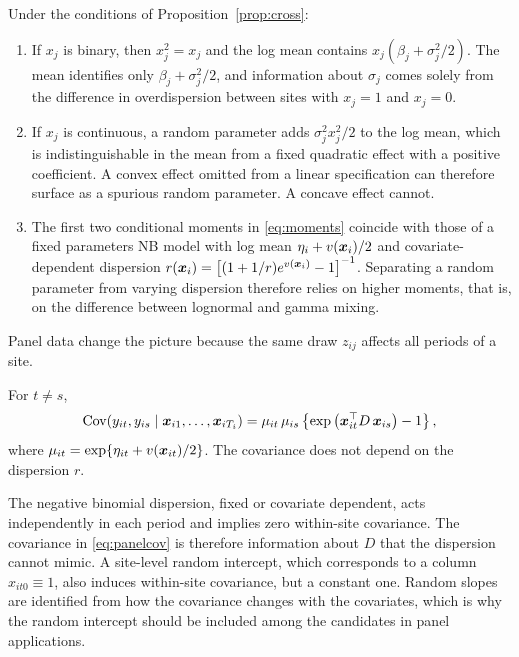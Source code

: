 \begin{corollary}\label{cor:confounding}
Under the conditions of Proposition~\ref{prop:cross}:
\begin{enumerate}[label=(\roman*)]
\item If $x_j$ is binary, then $x_j^2=x_j$ and the log mean contains $x_j(\beta_j+\sigma_j^2/2)$. The mean identifies only $\beta_j+\sigma_j^2/2$, and information about $\sigma_j$ comes solely from the difference in overdispersion between sites with $x_j=1$ and $x_j=0$.
\item If $x_j$ is continuous, a random parameter adds $\sigma_j^2x_j^2/2$ to the log mean, which is indistinguishable in the mean from a fixed quadratic effect with a positive coefficient. A convex effect omitted from a linear specification can therefore surface as a spurious random parameter. A concave effect cannot.
\item The first two conditional moments in \eqref{eq:moments} coincide with those of a fixed parameters NB model with log mean $\eta_i+v(\bm{x}_i)/2$ and covariate-dependent dispersion $r(\bm{x}_i)=\left[(1+1/r)e^{v(\bm{x}_i)}-1\right]^{-1}$. Separating a random parameter from varying dispersion \citep{miaou2003modeling} therefore relies on higher moments, that is, on the difference between lognormal and gamma mixing.
\end{enumerate}
\end{corollary}

Panel data change the picture because the same draw $z_{ij}$ affects all periods of a site.

\begin{proposition}\label{prop:panel}
For $t\neq s$,
\begin{equation}\label{eq:panelcov}
\operatorname{Cov}(y_{it},y_{is}\mid \bm{x}_{i1},\dots,\bm{x}_{iT_i})=\mu_{it}\,\mu_{is}\left\{\exp\left(\bm{x}_{it}^\top D\,\bm{x}_{is}\right)-1\right\},
\end{equation}
where $\mu_{it}=\exp\{\eta_{it}+v(\bm{x}_{it})/2\}$. The covariance does not depend on the dispersion $r$.
\end{proposition}

The negative binomial dispersion, fixed or covariate dependent, acts independently in each period and implies zero within-site covariance. The covariance in \eqref{eq:panelcov} is therefore information about $D$ that the dispersion cannot mimic. A site-level random intercept, which corresponds to a column $x_{it0}\equiv 1$, also induces within-site covariance, but a constant one. Random slopes are identified from how the covariance changes with the covariates, which is why the random intercept should be included among the candidates in panel applications.

